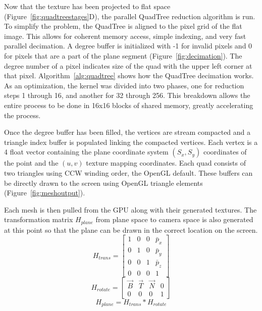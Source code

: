 Now that the texture has been projected to flat space (Figure~\ref{fig:quadtreestages}D), the parallel QuadTree reduction algorithm is run. To simplify the problem, the QuadTree is aligned to the pixel grid of the flat image. This allows for coherent memory access, simple indexing, and very fast parallel decimation. A degree buffer is initialized with -1 for invalid pixels and 0 for pixels that are a part of the plane segment (Figure~\ref{fig:decimation}). The degree number of a pixel indicates size of the quad with the upper left corner at that pixel. Algorithm~\ref{alg:quadtree} shows how the QuadTree decimation works. As an optimization, the kernel was divided into two phases, one for reduction steps 1 through 16, and another for 32 through 256. This breakdown allows the entire process to be done in 16x16 blocks of shared memory, greatly accelerating the process.\par
Once the degree buffer has been filled, the vertices are stream compacted and a triangle index buffer is populated linking the compacted vertices. Each vertex is a 4 float vector containing the plane coordinate system $(S_x,S_y)$ coordinates of the point and the $(u,v)$ texture mapping coordinates. Each quad consists of two triangles using CCW winding order, the OpenGL default. These buffers can be directly drawn to the screen using OpenGL triangle elements (Figure~\ref{fig:meshoutput}).\par
Each mesh is then pulled from the GPU along with their generated textures. The transformation matrix $H_{plane}$ from plane space to camera space is also generated at this point so that the plane can be drawn in the correct location on the screen. 
$$H_{trans} = \begin{bmatrix}
  1 & 0 & 0 & \bar{p}_x \\
  0 & 1 & 0 & \bar{p}_y \\
  0 & 0 & 1 & \bar{p}_z \\
  0 & 0 & 0 & 1
 \end{bmatrix}$$
 $$H_{rotate} = \begin{bmatrix}
  \vec{B} & \vec{T} & \vec{N} & 0 \\
  0 & 0 & 0 & 1
 \end{bmatrix}$$
$$H_{plane} = H_{trans}*H_{rotate}$$
